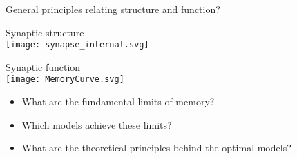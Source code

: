 \documentclass[final]{beamer}%
\begin{document}
\begin{frame}{General principles relating structure and function?}
%
 \vspace{-2\baselineskip}
 \begin{center}
 \parbox[t]{0.35\linewidth}{%
 \begin{center}
   Synaptic structure\\
   \texttt{[image: synapse\_internal.svg]}
 \end{center}
 }
 \hspace{0.1\linewidth}
 \parbox[t]{0.3\linewidth}{%
 \begin{center}
   Synaptic function\\
   \texttt{[image: MemoryCurve.svg]}
 \end{center}
 }
 \end{center}
 \begin{itemize}
   \item What are the fundamental limits of memory?
   \vp\item Which models achieve these limits?
   \vp\item What are the theoretical principles behind the optimal models?
 \end{itemize}
%
\end{frame}

\end{document}

